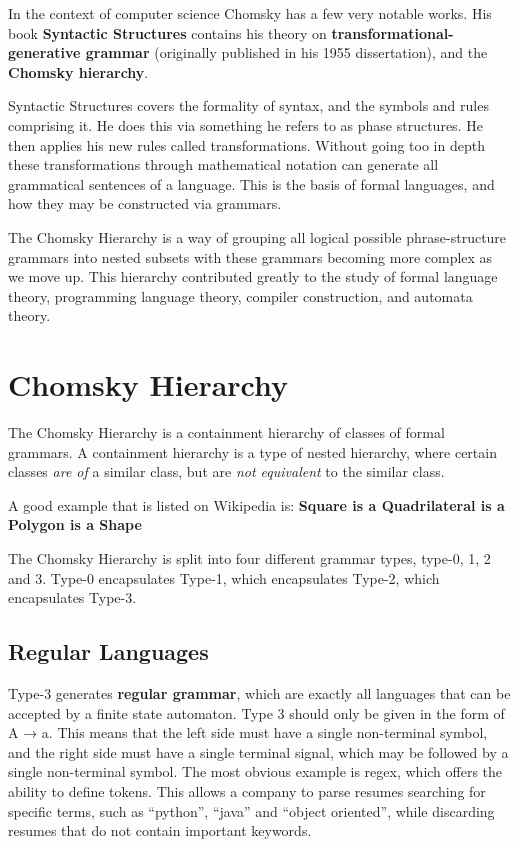 \documentclass{article}
\begin{document}
In the context of computer science Chomsky has a few very notable works. 
His book \textbf{Syntactic Structures} contains his theory on \textbf{transformational-generative grammar} (originally published in his 1955 dissertation), and the \textbf{Chomsky hierarchy}.
\medskip

Syntactic Structures covers the formality of syntax, and the symbols and rules comprising it. He does this via something he refers to as phase structures. 
He then applies his new rules called transformations. Without going too in depth these transformations through mathematical notation can generate all grammatical sentences of a language. 
This is the basis of formal languages, and how they may be constructed via grammars. 
\medskip

The Chomsky Hierarchy is a way of grouping all logical possible phrase-structure grammars into nested subsets with these grammars becoming more complex as we move up. 
This hierarchy contributed greatly to the study of formal language theory, programming language theory, compiler construction, and automata theory.

\section{Chomsky Hierarchy}  

The Chomsky Hierarchy is a containment hierarchy of classes of formal grammars.
A containment hierarchy is a type of nested hierarchy, where certain classes \textit{are of} a similar class, but are \textit{not equivalent} to the similar class.

A good example that is listed on Wikipedia is:
\textbf{Square is a Quadrilateral is a Polygon is a Shape}

The Chomsky Hierarchy is split into four different grammar types, type-0, 1, 2 and 3.
Type-0 encapsulates Type-1, which encapsulates Type-2, which encapsulates Type-3.

\subsection{Regular Languages} 

Type-3 generates \textbf{regular grammar}, which are exactly all languages that can be accepted by a finite state automaton. Type 3 should only be given in the form of A → a. 
This means that the left side must have a single non-terminal symbol, and the right side must have a single terminal signal, which may be followed by a single non-terminal symbol. 
The most obvious example is regex, which offers the ability to define tokens. This allows a company to parse resumes searching for specific terms, such as “python”, “java” and 
“object oriented”, while discarding resumes that do not contain important keywords.
\end{document}
